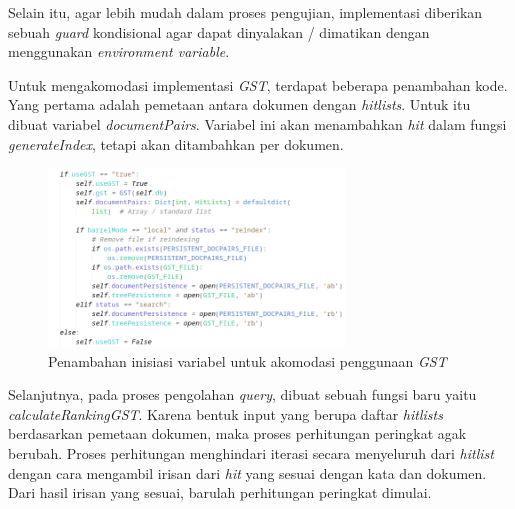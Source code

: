 Selain itu, agar lebih mudah dalam proses pengujian, implementasi diberikan 
sebuah \textit{guard} kondisional agar dapat dinyalakan / dimatikan dengan 
menggunakan \textit{environment variable}.

Untuk mengakomodasi implementasi \textit{GST}, terdapat beberapa penambahan 
kode. Yang pertama adalah pemetaan antara dokumen dengan \textit{hitlists}. Untuk 
itu dibuat variabel \textit{documentPairs}. Variabel ini akan menambahkan
\textit{hit} dalam fungsi \textit{generateIndex}, tetapi akan ditambahkan per 
dokumen.

\begin{figure}[H]
  \centering{}
	\includegraphics[width=0.7\textwidth]{gambar/implementasi_gst_init}
  \caption{Penambahan inisiasi variabel untuk akomodasi penggunaan \textit{GST}}
\end{figure}

Selanjutnya, pada proses pengolahan \textit{query}, dibuat sebuah fungsi baru 
yaitu \textit{calculateRankingGST}. Karena bentuk input yang berupa daftar
\textit{hitlists} berdasarkan pemetaan dokumen, maka proses perhitungan 
peringkat agak berubah. Proses perhitungan menghindari iterasi secara menyeluruh 
dari \textit{hitlist} dengan cara mengambil irisan dari \textit{hit} yang sesuai 
dengan kata dan dokumen. Dari hasil irisan yang sesuai, barulah perhitungan 
peringkat dimulai.

